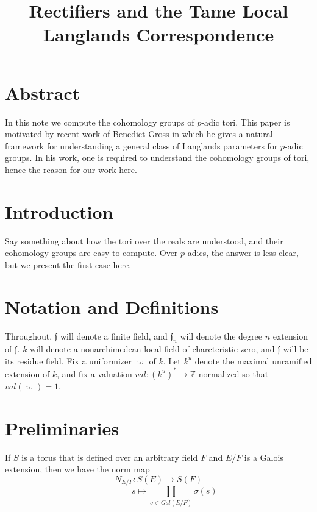 \documentclass[11pt]{amsart}
\theoremstyle{plain}
\begin{document}
\title{Rectifiers and the Tame Local Langlands Correspondence}





\maketitle

\section{Abstract}

In this note we compute the cohomology groups of $p$-adic tori.  This paper is motivated by recent work of Benedict Gross in which he gives a natural framework for understanding a general class of Langlands parameters for $p$-adic groups.  In his work, one is required to understand the cohomology groups of tori, hence the reason for our work here.

\section{Introduction}
Say something about how the tori over the reals are understood, and their cohomology groups are easy to compute.  Over $p$-adics, the answer is less clear, but we present the first case here.

\section{Notation and Definitions}

Throughout, $\mathfrak{f}$ will denote a finite field, and $\mathfrak{f}_n$ will denote the degree $n$ extension of $\mathfrak{f}$.  $k$ will denote a nonarchimedean local field of charcteristic zero, and $\mathfrak{f}$ will be its residue field.  Fix a uniformizer $\varpi$ of $k$.  Let $k^u$ denote the maximal unramified extension of $k$, and fix a valuation $val : (k^u)^* \rightarrow \mathbb{Z}$ normalized so that $val(\varpi) = 1$.

\section{Preliminaries}

If $S$ is a torus that is defined over an arbitrary field $F$ and $E/F$ is a Galois extension, then we have the norm map $$N_{E/F} : S(E) \rightarrow S(F)$$ $$\ \ \ \ \ \ \ \ \ \ \ \ \ \ \ \ \ s \mapsto \prod_{\sigma \in Gal(E/F)} \sigma(s)$$
\end{document}
